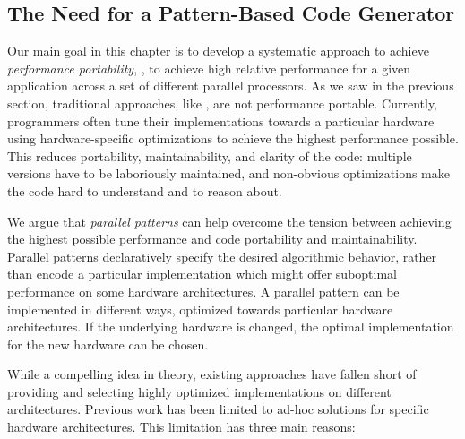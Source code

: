 

\subsection{The Need for a Pattern-Based Code Generator}

Our main goal in this chapter is to develop a systematic approach to achieve \emph{performance portability}, \ie, to achieve high relative performance for a given application across a set of different parallel processors.
As we saw in the previous section, traditional approaches, like \OpenCL, are not performance portable.
Currently, programmers often tune their implementations towards a particular hardware using hardware-specific optimizations to achieve the highest performance possible.
This reduces portability, maintainability, and clarity of the code:
multiple versions have to be laboriously maintained, and non-obvious optimizations make the code hard to understand and to reason about.

We argue that \emph{parallel patterns} can help overcome the tension between achieving the highest possible performance and code portability and maintainability.
Parallel patterns declaratively specify the desired algorithmic behavior, rather than encode a particular implementation which might offer suboptimal performance on some hardware architectures.
A parallel pattern can be implemented in different ways, optimized towards particular hardware architectures.
If the underlying hardware is changed, the optimal implementation for the new hardware can be chosen.

While a compelling idea in theory, existing approaches have fallen short of providing and selecting highly optimized implementations on different architectures.
Previous work has been limited to ad-hoc solutions for specific hardware architectures.
This limitation has three main reasons:


